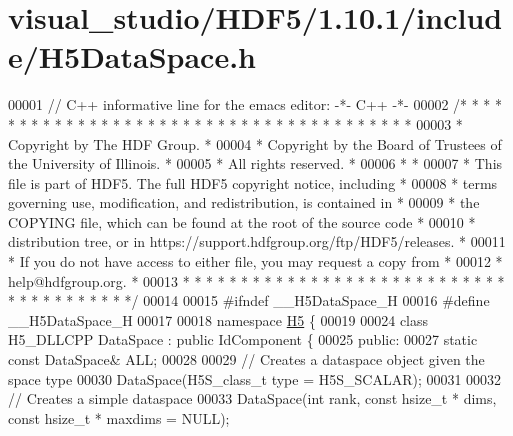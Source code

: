 \hypertarget{visual__studio_2_h_d_f5_21_810_81_2include_2_h5_data_space_8h_source}{}\section{visual\+\_\+studio/\+H\+D\+F5/1.10.1/include/\+H5\+Data\+Space.h}
\label{visual__studio_2_h_d_f5_21_810_81_2include_2_h5_data_space_8h_source}

\begin{DoxyCode}
00001 \textcolor{comment}{// C++ informative line for the emacs editor: -*- C++ -*-}
00002 \textcolor{comment}{/* * * * * * * * * * * * * * * * * * * * * * * * * * * * * * * * * * * * * * *}
00003 \textcolor{comment}{ * Copyright by The HDF Group.                                               *}
00004 \textcolor{comment}{ * Copyright by the Board of Trustees of the University of Illinois.         *}
00005 \textcolor{comment}{ * All rights reserved.                                                      *}
00006 \textcolor{comment}{ *                                                                           *}
00007 \textcolor{comment}{ * This file is part of HDF5.  The full HDF5 copyright notice, including     *}
00008 \textcolor{comment}{ * terms governing use, modification, and redistribution, is contained in    *}
00009 \textcolor{comment}{ * the COPYING file, which can be found at the root of the source code       *}
00010 \textcolor{comment}{ * distribution tree, or in https://support.hdfgroup.org/ftp/HDF5/releases.  *}
00011 \textcolor{comment}{ * If you do not have access to either file, you may request a copy from     *}
00012 \textcolor{comment}{ * help@hdfgroup.org.                                                        *}
00013 \textcolor{comment}{ * * * * * * * * * * * * * * * * * * * * * * * * * * * * * * * * * * * * * * */}
00014 
00015 \textcolor{preprocessor}{#ifndef \_\_H5DataSpace\_H}
00016 \textcolor{preprocessor}{#define \_\_H5DataSpace\_H}
00017 
00018 \textcolor{keyword}{namespace }\hyperlink{namespace_h5}{H5} \{
00019 
00024 \textcolor{keyword}{class }H5\_DLLCPP DataSpace : \textcolor{keyword}{public} IdComponent \{
00025    \textcolor{keyword}{public}:
00027         \textcolor{keyword}{static} \textcolor{keyword}{const} DataSpace& ALL;
00028 
00029         \textcolor{comment}{// Creates a dataspace object given the space type}
00030         DataSpace(H5S\_class\_t type = H5S\_SCALAR);
00031 
00032         \textcolor{comment}{// Creates a simple dataspace}
00033         DataSpace(\textcolor{keywordtype}{int} rank, \textcolor{keyword}{const} hsize\_t * dims, \textcolor{keyword}{const} hsize\_t * maxdims = NULL);

\end{DoxyCode}
